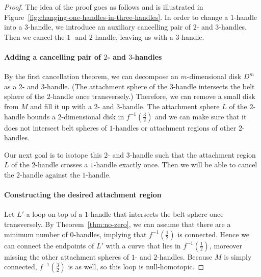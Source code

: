 \begin{proof}
    The idea of the proof goes as follows and is illustrated in Figure~\ref{fig:changing-one-handles-in-three-handles}.
    In order to change a $1$-handle into a $3$-handle, we introduce an auxiliary cancelling pair of $2$- and $3$-handles.
    Then we cancel the $1$- and $2$-handle, leaving us with a $3$-handle.
    \paragraph{Adding a cancelling pair of $2$- and $3$-handles}
    By the first cancellation theorem, we can decompose an $m$-dimensional disk $D^{m}$ as a $2$- and  $3$-handle. (The attachment sphere of the $3$-handle intersects the belt sphere of the $2$-handle once transversely.)
    Therefore, we can remove a small disk from $M$ and fill it up with a $2$- and $3$-handle.
    The attachment sphere $L$ of the $2$-handle bounds a $2$-dimensional disk in $f^{-1}(\frac{3}{2})$ and we can make sure that it does not intersect belt spheres of $1$-handles or attachment regions of other $2$-handles.

    Our next goal is to isotope this $2$- and $3$-handle such that the attachment region $L$ of the $2$-handle crosses a $1$-handle exactly once. Then we will be able to cancel the $2$-handle against the $1$-handle.

    \paragraph{Constructing the desired attachment region}
    Let $L'$ a loop on top of a $1$-handle that intersects the belt sphere once transversely.
    By Theorem~\ref{thm:no-zero}, we can assume that there are a minimum number of $0$-handles, implying that $f^{-1}(\frac{1}{2})$ is connected.
    Hence we can connect the endpoints of $L'$ with a curve that lies in $f^{-1}(\frac{1}{2})$,
    moreover missing the other attachment spheres of $1$- and $2$-handles.
    Because $M$ is simply connected, $f^{-1}(\frac{3}{2})$ is as well, so this loop is null-homotopic.

\end{proof}
